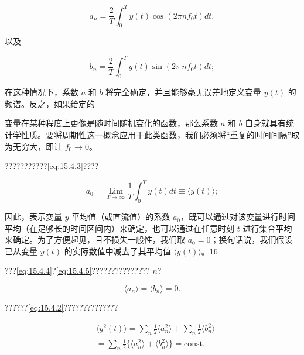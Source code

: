 \begin{equation}\tag{15.4.23}\label{eq:15.4.23}
a _ { n } = \frac { 2 } { T } \int _ { 0 } ^{T} y ( t ) \cos ( 2 \pi n f _ { 0 } t ) d t ,
\end{equation}

以及

\begin{equation}\tag{15.4.24}\label{eq:15.4.24}
b _ { n } = \frac { 2 } { T } \int _ { 0 } ^{T} y ( t ) \sin ( 2 \pi \, n f _ { 0 } t ) d t ;
\end{equation}

在这种情况下，系数 \(a\) 和 \(b\) 将完全确定，并且能够毫无误差地定义变量 \(y(t)\) 的频谱。反之，如果给定的

变量在某种程度上更像是随时间随机变化的函数，那么系数 \(a\) 和 \(b\) 自身就具有统计学性质。要将周期性这一概念应用于此类函数，我们必须将``重复的时间间隔''取为无穷大，即让 \(f_0 \to 0\)。

???????????\autoref{eq:15.4.3}????

\begin{equation}\tag{15.4.25}\label{eq:15.4.25}
a _ { 0 } = \operatorname* { L i m } _ { T \to \infty } { \frac { 1 } { T } } \int _ { 0 } ^{T} y ( t ) d t \equiv \langle y ( t ) \rangle ;
\end{equation}

因此，表示变量 \(y\) 平均值（或直流值）的系数 \(a_{0}\)，既可以通过对该变量进行时间平均（在足够长的时间区间内）来确定，也可以通过在任意时刻 \(t\) 进行集合平均来确定。为了方便起见，且不损失一般性，我们取 \(a_{0}=0\)；换句话说，我们假设已从变量 \(y(t)\) 的实际数值中减去了其平均值 \(\langle y(t)\rangle\)。16

???\autoref{eq:15.4.4}?\autoref{eq:15.4.5}??????????????? \(n\)?

\begin{equation}\tag{15.4.26}\label{eq:15.4.26}
\langle a _ { n } \rangle = \langle b _ { n } \rangle = 0 .
\end{equation}

??????\autoref{eq:15.4.2}??????????????

\begin{equation}\tag{15.4.27}\label{eq:15.4.27}
\begin{array}{rl} & { \langle y ^{2} ( t ) \rangle = \sum _ { n } \frac { 1 } { 2 } \langle a _ { n } ^{2} \rangle + \sum _ { n } \frac { 1 } { 2 } \langle b _ { n } ^{2} \rangle } \\& {  = \sum _ { n } \frac { 1 } { 2 } \Big \{ \langle a _ { n } ^{2} \rangle + \langle b _ { n } ^{2} \rangle \Big \} = \mathrm { c o n s t . } } \end{array}
\end{equation}

